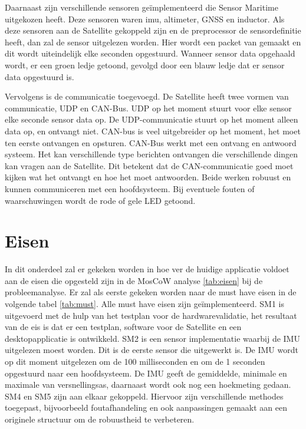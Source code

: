 \noindent Daarnaast zijn verschillende sensoren geïmplementeerd die Sensor Maritime uitgekozen heeft. Deze sensoren waren imu, altimeter, GNSS en inductor. Als deze sensoren aan de Satellite gekoppeld zijn en de preprocessor de sensordefinitie heeft, dan zal de sensor uitgelezen worden. Hier wordt een packet van gemaakt en dit wordt uiteindelijk elke seconden opgestuurd. Wanneer sensor data opgehaald wordt, er een groen ledje getoond, gevolgd door een blauw ledje dat er sensor data opgestuurd is. \newline

\noindent Vervolgens is de communicatie toegevoegd. De Satellite heeft twee vormen van communicatie, UDP en CAN-Bus. UDP op het moment stuurt voor elke sensor elke seconde sensor data op. De UDP-communicatie stuurt op het moment alleen data op, en ontvangt niet. CAN-bus is veel uitgebreider op het moment, het moet ten eerste ontvangen en opsturen. CAN-Bus werkt met een ontvang en antwoord systeem. Het kan verschillende type berichten ontvangen die verschillende dingen kan vragen aan de Satellite. Dit betekent dat de CAN-communicatie goed moet kijken wat het ontvangt en hoe het moet antwoorden. Beide werken robuust en kunnen communiceren met een hoofdsysteem. Bij eventuele fouten of waarschuwingen wordt de rode of gele LED getoond. 

\newpage
\section{Eisen}
In dit onderdeel zal er gekeken worden in hoe ver de huidige applicatie voldoet aan de eisen die opgesteld zijn in de MosCoW analyse \ref{tab:eisen} bij de probleemanalyse. Er zal als eerste gekeken worden naar de must have eisen in de volgende tabel \ref{tab:must}. Alle must have eisen zijn geïmplementeerd. SM1 is uitgevoerd met de hulp van het testplan voor de hardwarevalidatie, het resultaat van de eis is dat er een testplan, software voor de Satellite en een desktopapplicatie is ontwikkeld. SM2 is een sensor implementatie waarbij de IMU uitgelezen moest worden. Dit is de eerste sensor die uitgewerkt is. De IMU wordt op dit moment uitgelezen om de 100 milliseconden en om de 1 seconden opgestuurd naar een hoofdsysteem. De IMU geeft de gemiddelde, minimale en maximale van versnellingsas, daarnaast wordt ook nog een hoekmeting gedaan. SM4 en SM5 zijn aan elkaar gekoppeld. Hiervoor zijn verschillende methodes toegepast, bijvoorbeeld foutafhandeling en ook aanpassingen gemaakt aan een originele structuur om de robuustheid te verbeteren. 


